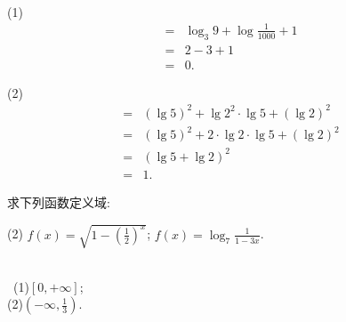 \documentclass{exam-zh}
\begin{document}
        \begin{solution}\\

          (1) 
          \begin{align*}
             = &\log_3 9 + \log \frac{1}{1000} +1 \\
             = &2 - 3 +1 \\
             = & 0.
          \end{align*}

          (2)
            \begin{align*}
              = & \left(\lg5\right)^{2}+\lg2^2\cdot\lg5+\left(\lg2\right)^{2}\\
               = & \left(\lg5\right)^{2}+2 \cdot \lg2\cdot\lg5+\left(\lg2\right)^{2}\\
               = & (\lg 5 + \lg 2)^2\\
               = & 1.
          \end{align*}

        \end{solution}




        
        \begin{problem}[points = 10]
          求下列函数定义域:

          \begin{tasks}[label=(\arabic*)](2)
              \task $f(x) = \sqrt{1-(\frac{1}{2})^x}$;
              \task $f(x) = \log_7 \frac{1}{1-3x}$.

          \end{tasks}
        \end{problem}


        
        \begin{solution}
          \\\
      (1)$[0,+\infty]$;\\
      (2)$(-\infty,\frac{1}{3})$.
        \end{solution}


\clearpage
\end{document}
